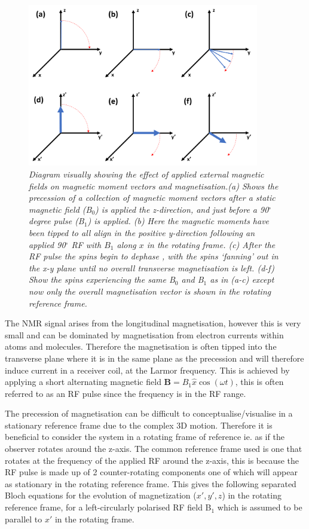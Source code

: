 \begin{figure}
    \centering
    \includegraphics[width=0.9\textwidth]{Figures/Theory/Magnetisation.png}
    \caption{\textit{Diagram visually showing the effect of applied external magnetic fields on magnetic moment vectors and magnetisation.(a) Shows the precession of a collection of magnetic moment vectors after a static magnetic field (B$_0$) is applied the z-direction, and just before a 90$^\circ$ degree pulse (B$_1$) is applied. (b) Here the magnetic moments have been tipped to all align in the positive y-direction following an applied 90$^\circ$ \ac{RF} with $B_1$ along $x$ in the rotating frame. (c) After the \ac{RF} pulse the spins begin to dephase , with the spins `fanning' out in the x-y plane until no overall transverse magnetisation is left. (d-f) Show the spins experiencing the same B$_0$ and B$_1$ as in (a-c) except now only the overall magnetisation vector is shown in the rotating reference frame.}}
    \label{fig:theory:Mag}
\end{figure}


The \ac{NMR} signal arises from the longitudinal magnetisation, however this is very small and can be dominated by magnetisation from electron currents within atoms and molecules. Therefore the magnetisation is often tipped into the transverse plane where it is in the same plane as the precession and will therefore induce current in a receiver coil, at the Larmor frequency. This is achieved by applying a short alternating magnetic field $\mathbf{B} = B_1\hat{x}\cos (\omega t)$, this is often referred to as an \ac{RF} pulse since the frequency is in the \ac{RF} range.

The precession of magnetisation can be difficult to conceptualise/visualise in a stationary reference frame due to the complex 3D motion. Therefore it is beneficial to consider the system in a rotating frame of reference ie. as if the observer rotates around the z-axis. The common reference frame used is one that rotates at the frequency of the applied \ac{RF} around the z-axis, this is because the \ac{RF} pulse is made up of 2 counter-rotating components one of which will appear as stationary in the rotating reference frame. This gives the following separated Bloch equations for the evolution of magnetization ($x',y',z$) in the rotating reference frame, for a left-circularly polarised \ac{RF} field B$_1$ which is assumed to be parallel to $x'$ in the rotating frame.

